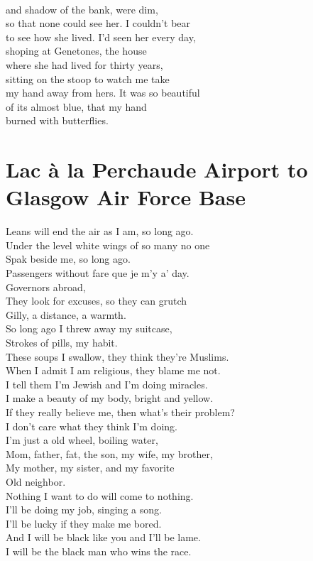 \documentclass[smalldemyvopaper,11pt,twoside,onecolumn,openright,extrafontsizes]{memoir}
\begin{document}
\\and shadow of the bank, were dim,
\\so that none could see her. I couldn't bear
\\to see how she lived. I'd seen her every day,
\\shoping at Genetones, the house
\\where she had lived for thirty years,
\\sitting on the stoop to watch me take
\\my hand away from hers. It was so beautiful
\\of its almost blue, that my hand
\\burned with butterflies.



\chapter{Lac à la Perchaude Airport to Glasgow Air Force Base}
Leans will end the air as I am, so long ago.
\\Under the level white wings of so many no one
\\Spak beside me, so long ago.
\\Passengers without fare que je m'y a' day.
\\Governors abroad,
\\They look for excuses, so they can grutch
\\Gilly, a distance, a warmth.
\\So long ago I threw away my suitcase,
\\Strokes of pills, my habit.
\\These soups I swallow, they think they're Muslims.
\\When I admit I am religious, they blame me not.
\\I tell them I'm Jewish and I'm doing miracles.
\\I make a beauty of my body, bright and yellow.
\\If they really believe me, then what's their problem?
\\I don't care what they think I'm doing.
\\I'm just a old wheel, boiling water,
\\Mom, father, fat, the son, my wife, my brother,
\\My mother, my sister, and my favorite
\\Old neighbor.
\\Nothing I want to do will come to nothing.
\\I'll be doing my job, singing a song.
\\I'll be lucky if they make me bored.
\\And I will be black like you and I'll be lame.
\\I will be the black man who wins the race.
\end{document}
